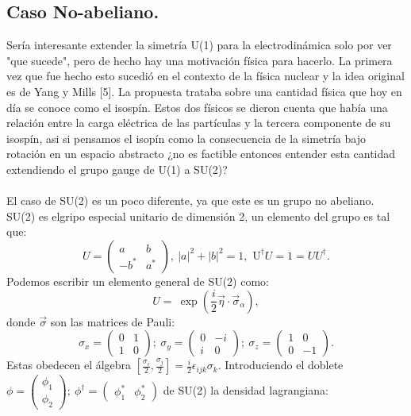 \subsection{Caso No-abeliano.}
Sería interesante extender la simetría U(1) para la electrodinámica solo por ver "que sucede", pero de hecho hay una motivación física para hacerlo. La primera vez que fue hecho esto sucedió en el contexto de la física nuclear y la idea original es de Yang y Mills [5]. La propuesta trataba sobre una cantidad física que hoy en día se conoce como el isospín. Estos dos físicos se dieron cuenta que había una relación entre la carga eléctrica de las partículas y la tercera componente de su isospín, asi si pensamos el isopín como la consecuencia de la simetría bajo rotación en un espacio abstracto ¿no es factible entonces entender esta cantidad extendiendo el grupo gauge de U(1) a SU(2)?
\\
\\
El caso de SU(2) es un poco diferente, ya que este es un grupo no abeliano. SU(2) es elgripo especial unitario de dimensión 2, un elemento del grupo es tal que: 
\begin{equation}
U=\left(\begin{array}{cc}
a & b\\
-b^{*} & a^{*}
\end{array}\right),\ |a|^{2}+|b|^{2}=1,\text{\ U}^{\dagger}U=1=UU^{\dagger}.
\end{equation}
Podemos escribir un elemento general de SU(2) como: 
\begin{equation}
U=\ \exp\left(\frac{i}{2}\vec{\eta}\cdot\vec{\sigma}_\alpha\right),
\end{equation}
donde $\vec{\sigma}$ son las matrices de Pauli:
\begin{equation}
\sigma_{x}=\left(\begin{array}{cc}
0 & 1\\
1 & 0
\end{array}\right);\ \sigma_{y}=\left(\begin{array}{cc}
0 & -i\\
i & 0
\end{array}\right);\ \sigma_{z}=\left(\begin{array}{cc}
1 & 0\\
0 & -1
\end{array}\right) .
\end{equation}
Estas obedecen el álgebra $[\frac{\sigma_i}{2},\frac{\sigma_j}{2}]=\frac{i}{2}\epsilon_{ijk}\sigma_k$.
Introduciendo el doblete $\phi=\left(\begin{array}{c}
\phi_{1}\\
\phi_{2}
\end{array}\right);\ \phi^{\dagger}=\left(\begin{array}{cc}
\phi_{1}^{*} & \phi_{2}^{*}\end{array}\right)$ de SU(2) la densidad lagrangiana:
